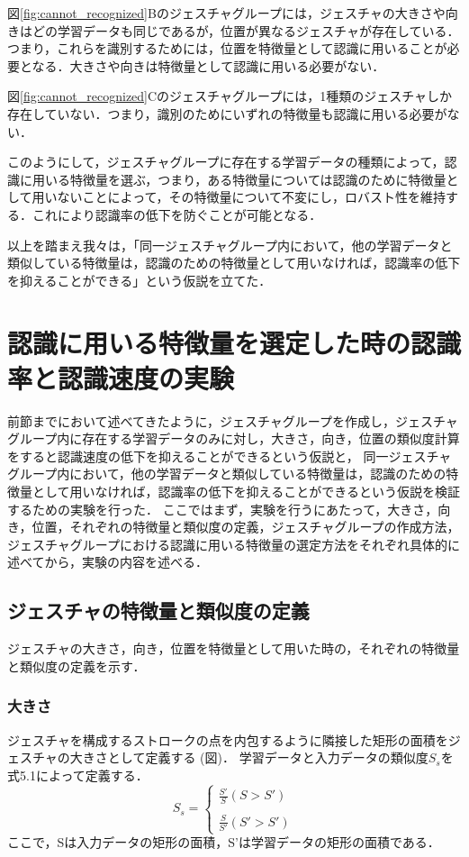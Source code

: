 図\ref{fig:cannot_recognized}Bのジェスチャグループには，ジェスチャの大きさや向きはどの学習データも同じであるが，位置が異なるジェスチャが存在している．つまり，これらを識別するためには，位置を特徴量として認識に用いることが必要となる．大きさや向きは特徴量として認識に用いる必要がない．

図\ref{fig:cannot_recognized}Cのジェスチャグループには，1種類のジェスチャしか存在していない．つまり，識別のためにいずれの特徴量も認識に用いる必要がない．

このようにして，ジェスチャグループに存在する学習データの種類によって，認識に用いる特徴量を選ぶ，つまり，ある特徴量については認識のために特徴量として用いないことによって，その特徴量について不変にし，ロバスト性を維持する．これにより認識率の低下を防ぐことが可能となる．

以上を踏まえ我々は，「同一ジェスチャグループ内において，他の学習データと類似している特徴量は，認識のための特徴量として用いなければ，認識率の低下を抑えることができる」という仮説を立てた．

\section{認識に用いる特徴量を選定した時の認識率と認識速度の実験}
前節までにおいて述べてきたように，ジェスチャグループを作成し，ジェスチャグループ内に存在する学習データのみに対し，大きさ，向き，位置の類似度計算をすると認識速度の低下を抑えることができるという仮説と，
同一ジェスチャグループ内において，他の学習データと類似している特徴量は，認識のための特徴量として用いなければ，認識率の低下を抑えることができるという仮説を検証するための実験を行った．
ここではまず，実験を行うにあたって，大きさ，向き，位置，それぞれの特徴量と類似度の定義，ジェスチャグループの作成方法，ジェスチャグループにおける認識に用いる特徴量の選定方法をそれぞれ具体的に述べてから，実験の内容を述べる．

\subsection{ジェスチャの特徴量と類似度の定義}
ジェスチャの大きさ，向き，位置を特徴量として用いた時の，それぞれの特徴量と類似度の定義を示す．

\subsubsection{大きさ}
ジェスチャを構成するストロークの点を内包するように隣接した矩形の面積をジェスチャの大きさとして定義する (図)．
学習データと入力データの類似度$S_\textit{s}$を式5.1によって定義する．
\begin{equation}
S_\textit{s} = \left \{
\begin{array}{l}
\frac{S'}{S} (S>S') \\\\
\frac{S}{S'} (S'>S')
\end{array}
\right.
\end{equation}
ここで，Sは入力データの矩形の面積，S'は学習データの矩形の面積である．

